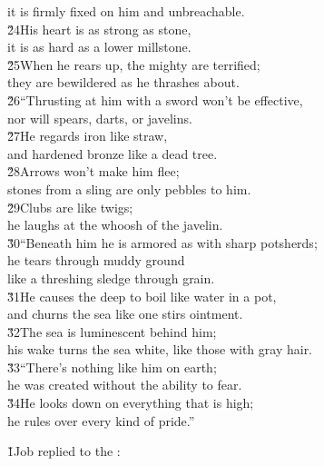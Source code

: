 \begin{poetry}
\poemll    it is firmly fixed on him and unbreachable. \\
\poeml \v{24}His heart is as strong as stone, \\
\poemll    it is as hard as a lower millstone. \\
\poeml \v{25}When he rears up, the mighty are terrified; \\
\poemll    they are bewildered as he thrashes about. \\
\poeml \v{26}``Thrusting at him with a sword won't be effective, \\
\poemll    nor will spears, darts, or javelins. \\
\poeml \v{27}He regards iron like straw, \\
\poemll    and hardened bronze like a dead tree. \\
\poeml \v{28}Arrows won't make him flee; \\
\poemll    stones from a sling are only pebbles to him. \\
\poeml \v{29}Clubs are like twigs; \\
\poemll    he laughs at the whoosh of the javelin. \\
\poeml \v{30}``Beneath him he is armored as with sharp potsherds; \\
\poemll    he tears through muddy ground \\
\poemlll       like a threshing sledge through grain. \\
\poeml \v{31}He causes the deep to boil like water in a pot, \\
\poemll    and churns the sea like one stirs ointment. \\
\poeml \v{32}The sea is luminescent behind him; \\
\poemll    his wake turns the sea white, like those with gray hair. \\
\poeml \v{33}``There's nothing like him on earth; \\
\poemll    he was created without the ability to fear. \\
\poeml \v{34}He looks down on everything that is high; \\
\poemll    he rules over every kind of pride.''
\end{poetry}

\v{1}Job replied to the :

